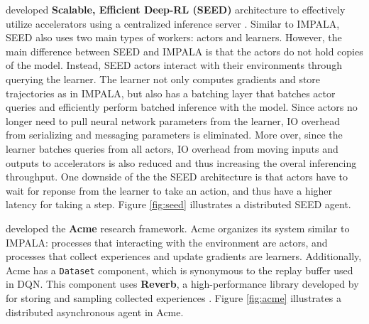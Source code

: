 \citeauthor{SEEDRLScalable_Espeholt.Marinier.ea_2020} developed \textbf{Scalable, Efficient Deep-RL (SEED)} architecture to effectively utilize accelerators using a centralized inference server \cite{SEEDRLScalable_Espeholt.Marinier.ea_2020}.
Similar to IMPALA, SEED also uses two main types of workers: actors and learners.
However, the main difference between SEED and IMPALA is that the actors do not hold copies of the model.
Instead, SEED actors interact with their environments through querying the learner.
The learner not only computes gradients and store trajectories as in IMPALA, but also has a batching layer that batches actor queries and efficiently perform batched inference with the model.
Since actors no longer need to pull neural network parameters from the learner, IO overhead from serializing and messaging parameters is eliminated.
More over, since the learner batches queries from all actors, IO overhead from moving inputs and outputs to accelerators is also reduced and thus increasing the overal inferencing throughput.
One downside of the the SEED architecture is that actors have to wait for reponse from the learner to take an action, and thus have a higher latency for taking a step.
Figure \ref{fig:seed} illustrates a distributed SEED agent.

\citeauthor{AcmeResearchFramework_Hoffman.Shahriari.ea_2020} developed the \textbf{Acme} research framework.
Acme organizes its system similar to IMPALA:
processes that interacting with the environment are actors,
and processes that collect experiences and update gradients are learners.
Additionally, Acme has a \Verb|Dataset| component, which is synonymous to the replay buffer used in DQN.
This component uses \textbf{Reverb}, a high-performance library developed by \citeauthor{ReverbFrameworkExperience_Cassirer.Barth-Maron.ea_2021} for storing and sampling collected experiences \cite{ReverbFrameworkExperience_Cassirer.Barth-Maron.ea_2021}.
Figure \ref{fig:acme} illustrates a distributed asynchronous agent in Acme.


